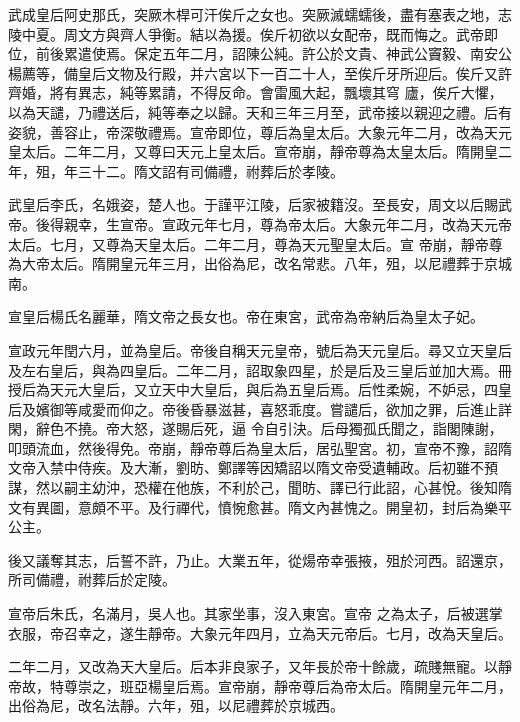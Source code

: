 \begin{pinyinscope}
 武成皇后阿史那氏，突厥木桿可汗俟斤之女也。突厥滅蠕蠕後，盡有塞表之地，志陵中夏。周文方與齊人爭衡。結以為援。俟斤初欲以女配帝，既而悔之。武帝即位，前後累遣使焉。保定五年二月，詔陳公純。許公於文貴、神武公竇毅、南安公楊薦等，備皇后文物及行殿，并六宮以下一百二十人，至俟斤牙所迎后。俟斤又許齊婚，將有異志，純等累請，不得反命。會雷風大起，飄壞其穹
 廬，俟斤大懼，以為天譴，乃禮送后，純等奉之以歸。天和三年三月至，武帝接以親迎之禮。后有姿貌，善容止，帝深敬禮焉。宣帝即位，尊后為皇太后。大象元年二月，改為天元皇太后。二年二月，又尊曰天元上皇太后。宣帝崩，靜帝尊為太皇太后。隋開皇二年，殂，年三十二。隋文詔有司備禮，祔葬后於孝陵。



 武皇后李氏，名娥姿，楚人也。于謹平江陵，后家被籍沒。至長安，周文以后賜武帝。後得親幸，生宣帝。宣政元年七月，尊為帝太后。大象元年二月，改為天元帝太后。七月，又尊為天皇太后。二年二月，尊為天元聖皇太后。宣
 帝崩，靜帝尊為大帝太后。隋開皇元年三月，出俗為尼，改名常悲。八年，殂，以尼禮葬于京城南。



 宣皇后楊氏名麗華，隋文帝之長女也。帝在東宮，武帝為帝納后為皇太子妃。



 宣政元年閏六月，並為皇后。帝後自稱天元皇帝，號后為天元皇后。尋又立天皇后及左右皇后，與為四皇后。二年二月，詔取象四星，於是后及三皇后並加大焉。冊授后為天元大皇后，又立天中大皇后，與后為五皇后焉。后性柔婉，不妒忌，四皇后及嬪御等咸愛而仰之。帝後昏暴滋甚，喜怒乖度。嘗譴后，欲加之罪，后進止詳閑，辭色不撓。帝大怒，遂賜后死，逼
 令自引決。后母獨孤氏聞之，詣閣陳謝，叩頭流血，然後得免。帝崩，靜帝尊后為皇太后，居弘聖宮。初，宣帝不豫，詔隋文帝入禁中侍疾。及大漸，劉昉、鄭譯等因矯詔以隋文帝受遺輔政。后初雖不預謀，然以嗣主幼沖，恐權在他族，不利於己，聞昉、譯已行此詔，心甚悅。後知隋文有異圖，意頗不平。及行禪代，憤惋愈甚。隋文內甚愧之。開皇初，封后為樂平公主。



 後又議奪其志，后誓不許，乃止。大業五年，從煬帝幸張掖，殂於河西。詔還京，所司備禮，祔葬后於定陵。



 宣帝后朱氏，名滿月，吳人也。其家坐事，沒入東宮。宣帝
 之為太子，后被選掌衣服，帝召幸之，遂生靜帝。大象元年四月，立為天元帝后。七月，改為天皇后。



 二年二月，又改為天大皇后。后本非良家子，又年長於帝十餘歲，疏賤無寵。以靜帝故，特尊崇之，班亞楊皇后焉。宣帝崩，靜帝尊后為帝太后。隋開皇元年二月，出俗為尼，改名法靜。六年，殂，以尼禮葬於京城西。




\end{pinyinscope}
